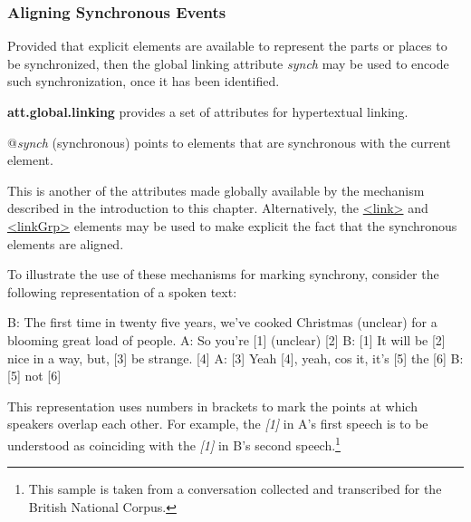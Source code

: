 \subsubsection[{Aligning Synchronous Events}]{Aligning Synchronous Events}\label{SASYNC}\par
Provided that explicit elements are available to represent the parts or places to be synchronized, then the global linking attribute {\itshape synch} may be used to encode such synchronization, once it has been identified. 
\begin{sansreflist}
  
\item [\textbf{att.global.linking}] provides a set of attributes for hypertextual linking.\hfil\\[-10pt]\begin{sansreflist}
    \item[@{\itshape synch}]
  (synchronous) points to elements that are synchronous with the current element.
\end{sansreflist}  
\end{sansreflist}
 This is another of the attributes made globally available by the mechanism described in the introduction to this chapter. Alternatively, the \hyperref[TEI.link]{<link>} and \hyperref[TEI.linkGrp]{<linkGrp>} elements may be used to make explicit the fact that the synchronous elements are aligned.\par
To illustrate the use of these mechanisms for marking synchrony, consider the following representation of a spoken text:  \par\hfill\bgroup\exampleFont\vskip 10pt\begin{shaded}
\obeyspaces B: The first time in twenty five years, we've cooked Christmas\newline
   (unclear) for a blooming great load of people.\newline
A: So you're [1] (unclear) [2]\newline
B: [1] It will be [2] nice in a way, but, [3] be strange. [4]\newline
A: [3] Yeah [4], yeah, cos it, it's [5] the [6]\newline
B: [5] not [6]\end{shaded}
\par\egroup 
\par
This representation uses numbers in brackets to mark the points at which speakers overlap each other. For example, the \textit{[1]} in A's first speech is to be understood as coinciding with the \textit{[1]} in B's second speech.\footnote{This sample is taken from a conversation collected and transcribed for the British National Corpus.}\par
